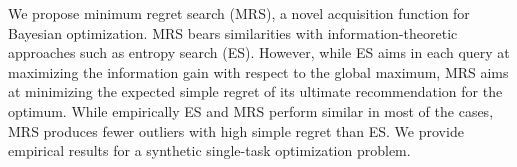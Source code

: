 

\begin{block}{}
\justifying
We propose minimum regret search (MRS), a novel acquisition function for Bayesian
optimization. MRS bears similarities with information-theoretic approaches
such as entropy search (ES). However, while ES aims in each query at maximizing the
information gain with respect to the global maximum, MRS aims at minimizing the
expected simple regret of its ultimate recommendation for the optimum. While empirically ES and MRS perform similar in most of the
cases, MRS produces fewer outliers with high simple regret than ES. We provide empirical
results for a synthetic single-task optimization problem.
\end{block}

